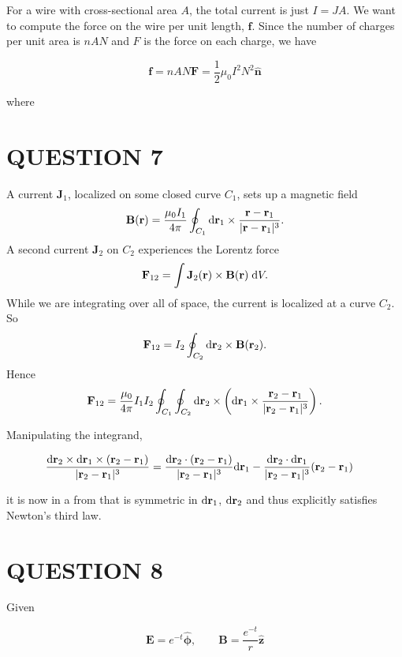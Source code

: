 \documentclass[a4paper]{article}
\begin{document}
For a wire with cross-sectional area $ A $, the total current is just $ I = JA $. We want to compute the force on the wire per unit length, $ \mathbf{f} $. Since the
number of charges per unit area is $ nAN $ and $ F $ is the force on each charge, we have

\[ \mathbf{f} = n A N \mathbf{F} = \frac{1}{2} \mu_{0} I^{2} N^{2} \hat{\mathbf{n}}\]

where $  $


\section{QUESTION 7}

A current $\mathbf{J}_1$, localized on some closed curve $C_1$, sets up a magnetic field
\[
\mathbf{B}(\mathbf{r}) = \frac{\mu_0I_1}{4\pi}\oint_{C_1} \mathrm{d} \mathbf{r}_1 \times \frac{\mathbf{r} - \mathbf{r}_1}{|\mathbf{r} - \mathbf{r}_1|^3}.
\]
A second current $\mathbf{J}_2$ on $C_2$ experiences the Lorentz force
\[
\mathbf{F}_{12} = \int \mathbf{J}_2(\mathbf{r})\times \mathbf{B}(\mathbf{r})\;\mathrm{d} V.
\]
While we are integrating over all of space, the current is localized at a curve $C_2$. So
\[
\mathbf{F}_{12} = I_2\oint_{C_2} \mathrm{d} \mathbf{r}_2 \times \mathbf{B}(\mathbf{r}_2).
\]
Hence
\[
\mathbf{F}_{12} = \frac{\mu_0}{4\pi} I_1 I_2 \oint_{C_1}\oint_{C_2}\mathrm{d} \mathbf{r}_2\times \left(\mathrm{d} \mathbf{r}_1\times \frac{\mathbf{r}_2 - \mathbf{r}_1}{|\mathbf{r}_2 - \mathbf{r}_1|^3}\right).
\]


Manipulating the integrand,

\begin{align*}
 \frac{\mathrm{d} \mathbf{r}_2\times \mathrm{d} \mathbf{r}_1\times (\mathbf{r}_2 - \mathbf{r}_1)}{|\mathbf{r}_2 - \mathbf{r}_1|^3} & = \frac{ \mathrm{d} \mathbf{r}_2 \cdot (\mathbf{r}_2 - \mathbf{r}_1)}{|\mathbf{r}_2 - \mathbf{r}_1|^3} \mathrm{d} \mathbf{r}_1  - \frac{ \mathrm{d} \mathbf{r}_2 \cdot \mathrm{d} \mathbf{r}_1 }{|\mathbf{r}_2 - \mathbf{r}_1|^3} (\mathbf{r}_2 - \mathbf{r}_1)
\end{align*}

it is now in a from that is symmetric in $ \mathrm{d} \mathbf{r}_1 $, $ \mathrm{d} \mathbf{r}_2 $ and thus explicitly satisfies Newton's third law. 

\section{QUESTION 8}

Given

\[ \mathbf{E} = e^{-t} \hat{\boldsymbol{\phi}}, \qquad \mathbf{B} = \frac{e^{-t}}{r} \hat{\mathbf{z}}  \]
\end{document}
